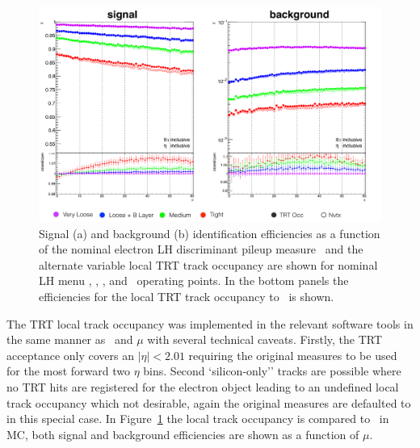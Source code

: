 \begin{figure}[h]
\centering
\includegraphics[width=.95\textwidth]{figs/egamma/TRTLocalTrackOcc.png}
\caption[Signal (a) and background (b) identification efficiencies as a function of the nominal electron LH discriminant pileup measure \nvtx\ and the alternate variable local TRT track occupancy.]{Signal (a) and background (b) identification efficiencies as a function of the nominal electron LH discriminant pileup measure \nvtx\ and the alternate variable local TRT track occupancy are shown for nominal LH menu \Tight, \Medium, \Loose, and \VeryLoose\ operating points.
In the bottom panels the efficiencies for the local TRT track occupancy to \nvtx\ is shown.
}
\label{fig:egamma:TRTLocalTrackOcc}
\end{figure}
The TRT local track occupancy was implemented in the relevant software tools in the same manner as \nvtx\ and $\mu$ with several technical caveats.
Firstly, the TRT acceptance only covers an $|\eta|<2.01$ requiring the original measures to be used for the most forward two $\eta$ bins. 
Second `silicon-only'' tracks are possible where no TRT hits are registered for the electron object leading to an undefined local track occupancy which not desirable, again the original measures are defaulted to in this special case. 
In Figure~\ref{fig:egamma:TRTLocalTrackOcc} the local track occupancy is compared to \nvtx\ in MC, both signal and background efficiencies are shown as a function of $\mu$.
